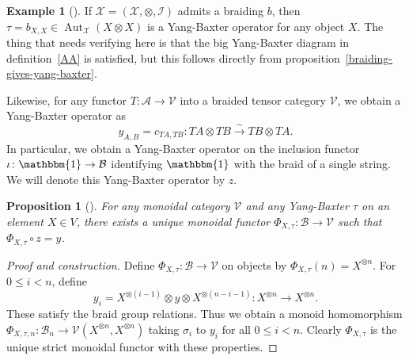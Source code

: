 \documentclass[reqno]{amsart}
\newtheorem{proposition}[theorem]{Proposition}
\theoremstyle{definition}
\newtheorem{example}[theorem]{Example}
\theoremstyle{remark}
\DeclareMathOperator{\Aut}{Aut}
\begin{document}
     \begin{example}[]
         If $\mathcal{X} = \left( 
         \mathcal{X, \otimes, I}\right) $ admits a braiding
         $b$, then $\tau = b_{X,X} \in 
         \Aut_{\mathcal{X}} \left( X \otimes X \right) $ 
         is a Yang-Baxter operator for any object
         $X$. The thing that needs verifying here
         is that the big Yang-Baxter diagram in definition~\ref{AA}
         is satisfied, but
         this follows directly from
         proposition~\ref{braiding-gives-yang-baxter}.

         Likewise, for any functor
         $T \colon \mathcal{A} \to \mathcal{V}$ into a 
         braided tensor category $\mathcal{V}$, we obtain
         a Yang-Baxter operator as
         \[
         y_{A,B} = c_{TA,TB} \colon TA \otimes TB
         \stackrel{\sim}{\to } TB \otimes TA.
         \] 
         In particular, we obtain a Yang-Baxter operator
         on the inclusion functor 
         $\iota \colon \mathbbm{1} \to \mathcal{B}$ 
         identifying $\mathbbm{1}$ with the braid
         of a single string. We will
         denote this Yang-Baxter operator by $z$.
     \end{example}



         

     \begin{proposition}[]\label{yang-baxter-inducing-representation}
         For any monoidal category $\mathcal{V}$ and
         any Yang-Baxter $\tau$ on an element $X \in V$, there
         exists a unique monoidal functor
         $\Phi_{X, \tau} \colon \mathcal{B} \to \mathcal{V}$ such that
         $\Phi_{X, \tau} \circ z = y$.
     \end{proposition}


     \begin{proof}[Proof and construction]
         Define $\Phi_{X, \tau} \colon \mathcal{B} \to \mathcal{V}$ 
         on objects by $\Phi_{X,\tau} (n) = 
         X^{\otimes n}$. For
         $0 \le i < n$, define 
         \[
         y_i = X^{\otimes (i-1)} \otimes y 
         \otimes X^{\otimes (n-i-1)} \colon X^{\otimes n} \to 
         X^{\otimes n}.
         \] 
         These satisfy the braid group relations.
         Thus we obtain a monoid homomorphism
         $\Phi_{X, \tau, n} \colon \mathcal{B}_n \to 
         \mathcal{V} \left( X^{\otimes n}, X^{\otimes n} \right) $ 
         taking $\sigma_i$ to $y_i$ for all
         $0 \le i <n$. Clearly $\Phi_{X, \tau}$ is the unique
         strict monoidal functor with these properties.
     \end{proof}
\end{document}
